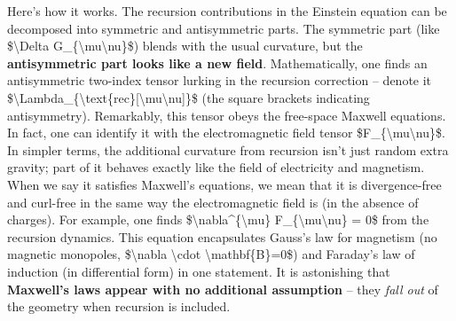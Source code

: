 \documentclass[
]{article}
\begin{document}
Here's how it works. The recursion contributions in the Einstein
equation can be decomposed into symmetric and antisymmetric parts. The
symmetric part (like \$\textbackslash Delta
G\_\{\textbackslash mu\textbackslash nu\}\$) blends with the usual
curvature, but the \textbf{antisymmetric part looks like a new field}.
Mathematically, one finds an antisymmetric two-index tensor lurking in
the recursion correction -- denote it
\$\textbackslash Lambda\_\{\textbackslash text\{rec\}{[}\textbackslash mu\textbackslash nu{]}\}\$
(the square brackets indicating antisymmetry). Remarkably, this tensor
obeys the free-space Maxwell equations. In fact, one can identify it
with the electromagnetic field tensor
\$F\_\{\textbackslash mu\textbackslash nu\}\$\hspace{0pt}. In simpler
terms, the additional curvature from recursion isn't just random extra
gravity; part of it behaves exactly like the field of electricity and
magnetism. When we say it satisfies Maxwell's equations, we mean that it
is divergence-free and curl-free in the same way the electromagnetic
field is (in the absence of charges). For example, one finds
\$\textbackslash nabla\^{}\{\textbackslash mu\}
F\_\{\textbackslash mu\textbackslash nu\} = 0\$ from the recursion
dynamics\hspace{0pt}. This equation encapsulates Gauss's law for
magnetism (no magnetic monopoles, \$\textbackslash nabla
\textbackslash cdot \textbackslash mathbf\{B\}=0\$) and Faraday's law of
induction (in differential form) in one statement. It is astonishing
that \textbf{Maxwell's laws appear with no additional assumption} --
they \emph{fall out} of the geometry when recursion is included.
\end{document}
